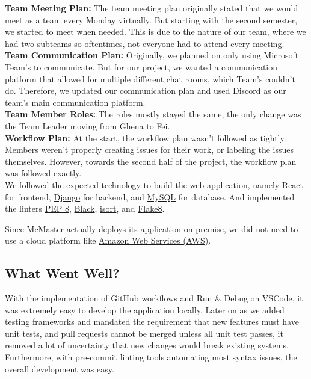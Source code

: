 \documentclass{article}
\begin{document}
\textbf{Team Meeting Plan: } The team meeting plan originally stated that we would meet as a team every Monday virtually. But starting with the second semester, we started to meet when needed. This is due to the nature of our team, where we had two subteams so oftentimes, not everyone had to attend every meeting. \\
\textbf{Team Communication Plan: } Originally, we planned on only using Microsoft Team's to communicate. But for our project, we wanted a communication platform that allowed for multiple different chat rooms, which Team's couldn't do. Therefore, we updated our communication plan and used Discord as our team's main communication platform. \\
\textbf{Team Member Roles: } The roles mostly stayed the same, the only change was the Team Leader moving from Ghena to Fei. \\
\textbf{Workflow Plan: } At the start, the workflow plan wasn't followed as tightly. Members weren't properly creating issues for their work, or labeling the issues themselves. However, towards the second half of the project, the workflow plan was followed exactly. \\

We followed the expected technology to build the web application, namely \href{https://react.dev/}{React} for frontend, \href{https://www.djangoproject.com/}{Django} for backend, and \href{https://www.mysql.com/}{MySQL} for database. And implemented the linters \href{https://peps.python.org/pep-0008/}{PEP 8}, \href{https://github.com/psf/black}{Black},
\href{https://pycqa.github.io/isort/}{isort}, and \href{https://flake8.pycqa.org/en/latest/}{Flake8}.

Since McMaster actually deploys its application on-premise, we did not need to use a cloud platform like \href{https://aws.amazon.com/}{Amazon Web Services (AWS)}.

\subsection{What Went Well?}

With the implementation of GitHub workflows and Run \& Debug on VSCode, it was extremely easy to develop the application locally. Later on as we added testing frameworks and mandated the requirement that new features must have unit tests, and pull requests cannot be merged unless all unit test passes, it removed a lot of uncertainty that new changes would break existing systems.
Furthermore, with pre-commit linting tools automating most syntax issues, the overall development was easy.
\end{document}

